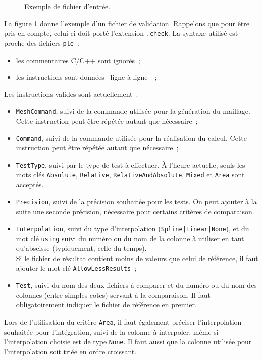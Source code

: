 \documentclass[a4paper,12pt]{article}
\newcommand{\code}[1]{
  \psframebox[linecolor=orange,shadow=true,blur=true]{
    \begin{minipage}[htbp]{1.0\linewidth}
      \tt\small #1
    \end{minipage}
  }
}
\begin{document}
\begin{figure}[htbp]
  \centering
  \code{
    
  }
  \caption{Exemple de fichier d'entrée.}
  \label{fig:entry}
\end{figure}

La figure \ref{fig:entry} donne l'exemple d'un fichier de validation.
Rappelons que pour être pris en compte, celui-ci doit porté
l'extension {\tt .check}. La syntaxe utilisé est proche des fichiers
{\tt ple}~:
\begin{itemize}
  \item les commentaires C/C++ sont ignorés~;
  \item les instructions sont données \og~ligne à ligne~\fg~;
\end{itemize}

Les instructions valides sont actuellement~:
\begin{itemize}
  \item {\tt MeshCommand}, suivi de la commande utilisée pour la
    génération du maillage. Cette instruction peut être répétée autant que nécessaire~;
  \item {\tt Command}, suivi de la commande utilisée pour la
    réalisation du calcul. Cette instruction peut être répétée autant que nécessaire~;
  
  \item {\tt TestType}, suivi par le type de test à effectuer. À
    l'heure actuelle, seuls les mots clés {\tt Absolute}, {\tt Relative}, {\tt RelativeAndAbsolute}, {\tt Mixed} et {\tt Area} sont acceptés.
  \item {\tt Precision}, suivi de la précision souhaitée pour les tests. On peut ajouter à la suite une seconde précision, nécessaire pour certains critères de comparaison.
  \item {\tt Interpolation}, suivi du type d'interpolation ({\tt Spline|Linear|None}), et du mot clé {\tt using} suivi du numéro
   ou du nom de la colonne à utiliser en tant qu'abscisse (typiquement, celle du temps).\\Si le fichier de résultat contient moins de valeurs que celui de référence, il faut ajouter le mot-clé {\tt AllowLessResults}~;
  \item {\tt Test}, suivi du nom des deux fichiers à comparer et du
    numéro ou du nom des colonnes (entre simples cotes)
    servant à la comparaison. Il faut obligatoirement indiquer le fichier de référence en premier.
\end{itemize}

Lors de l'utilisation du critère {\tt Area}, il faut également préciser l'interpolation souhaitée pour l'intégration, suivi de la colonne à interpoler, même si l'interpolation choisie est de type {\tt None}. Il faut aussi que la colonne utilisée pour l'interpolation soit triée en ordre croissant.
\end{document}
